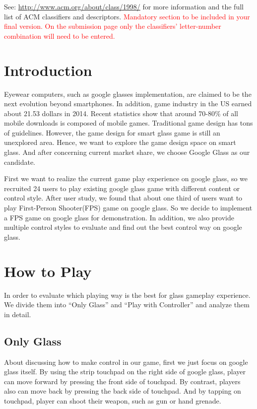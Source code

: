 \documentclass{sigchi}
\begin{document}


See: \url{http://www.acm.org/about/class/1998/}
for more information and the full list of ACM classifiers
and descriptors. 
\textcolor{red}{Mandatory section to be included in your
final version. On the submission page only the classifiers'
letter-number combination will need to be entered.}

\section{Introduction}
Eyewear computers, such as google glasses implementation, are claimed to be the next evolution beyond smartphones. In addition, game industry in the US earned about 21.53 dollars in 2014\cite{essentialfacts}. Recent statistics show that around 70-80\% of all mobile downloads is composed of mobile games\cite{statistics,infographic}. Traditional game design has tons of guidelines\cite{videogame,mobilegame,bodygame,gameflow,argame,wearable}. However, the game design for smart glass game is still an unexplored area. Hence, we want to explore the game design space on smart glass. And after concerning current market share, we choose Google Glass as our candidate.

First we want to realize the current game play experience on google glass, so we recruited 24 users to play existing google glass game\cite{minigame} with different content or control style. After user study, we found that about one third of users want to play First-Person Shooter(FPS) game on google glass. So we decide to implement a FPS game on google glass for demonstration. In addition, we also provide multiple control styles to evaluate and find out the best control way on google glass. 

\section{How to Play}
In order to evaluate which playing way is the best for glass gameplay experience. We divide them into ``Only Glass'' and ``Play with Controller'' and analyze them in detail.

\subsection{Only Glass}
About discussing how to make control in our game, first we just focus on google glass itself. By using the strip touchpad on the right side of google glass, player can move forward by pressing the front side of touchpad. By contrast, players also can move back by pressing the back side of touchpad. And by tapping on touchpad, player can shoot their weapon, such as gun or hand grenade.
\end{document}
